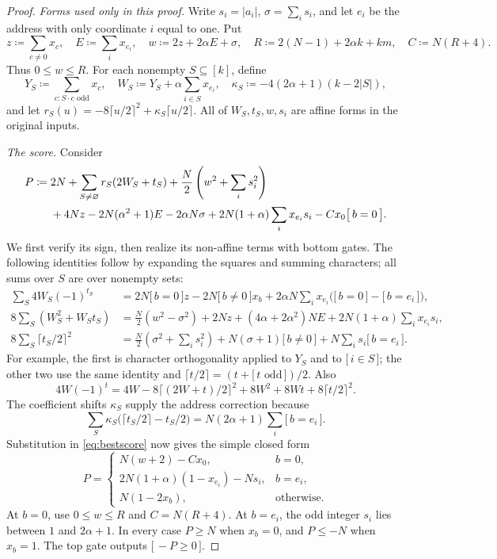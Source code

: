 \documentclass[11pt,letterpaper]{article}
\theoremstyle{remark}
\newcommand{\ind}[1]{\bigl[\,#1\,\bigr]}
\begin{document}
\begin{proof}
\emph{Forms used only in this proof.}
Write $s_i=|a_i|$, $\sigma=\sum_i s_i$, and let $e_i$ be the address with
only coordinate $i$ equal to one. Put
\[
z\coloneqq\sum_{c\ne0}x_c,\quad E\coloneqq\sum_i x_{e_i},\quad
w\coloneqq2z+2\alpha E+\sigma,\quad R\coloneqq2(N-1)+2\alpha k+km,\quad C\coloneqq N(R+4).
\]
Thus $0\le w\le R$. For each nonempty $S\subseteq[k]$, define
\[
Y_S\coloneqq\sum_{c:S\cdot c\text{ odd}}x_c,\quad
W_S\coloneqq Y_S+\alpha\sum_{i\in S}x_{e_i},\quad
\kappa_S\coloneqq-4(2\alpha+1)(k-2|S|),
\]
and let $r_S(u)=-8\lceil u/2\rceil^2+\kappa_S\lceil u/2\rceil$.
All of $W_S,t_S,w,s_i$ are affine forms in the original inputs.

\emph{The score.} Consider
\begin{align}\label{eq:bestscore}
P\coloneqq{}&2N+\sum_{S\ne\varnothing}r_S(2W_S+t_S)
 +\frac N2\left(w^2+\sum_i s_i^2\right)\notag\\
 &+4Nz-2N(\alpha^2+1)E-2\alpha N\sigma
 +2N(1+\alpha)\sum_i x_{e_i}s_i-Cx_0\ind{b=0}.
\end{align}
We first verify its sign, then realize its non-affine terms with bottom gates.
The following identities follow by expanding the squares and summing
characters; all sums over $S$ are over nonempty sets:
\begin{align*}
\sum_S4W_S(-1)^{t_S}
 &=2N\ind{b=0}z-2N\ind{b\ne0}x_b
   +2\alpha N\sum_i x_{e_i}\bigl(\ind{b=0}-\ind{b=e_i}\bigr),\\
8\sum_S(W_S^2+W_St_S)
 &=\frac N2(w^2-\sigma^2)+2Nz+(4\alpha+2\alpha^2)NE
   +2N(1+\alpha)\sum_i x_{e_i}s_i,\\
8\sum_S\lceil t_S/2\rceil^2
 &=\frac N2\left(\sigma^2+\sum_i s_i^2\right)
   +N(\sigma+1)\ind{b\ne0}+N\sum_i s_i\ind{b=e_i}.
\end{align*}
For example, the first is character orthogonality applied to $Y_S$ and to
$\ind{i\in S}$; the other two use the same identity and
$\lceil t/2\rceil=(t+\ind{t\text{ odd}})/2$.
Also
\[
4W(-1)^t=4W-8\lceil(2W+t)/2\rceil^2+8W^2+8Wt+8\lceil t/2\rceil^2.
\]
The coefficient shifts $\kappa_S$ supply the address correction because
\[
\sum_S\kappa_S\bigl(\lceil t_S/2\rceil-t_S/2\bigr)
 =N(2\alpha+1)\sum_i\ind{b=e_i}.
\]
Substitution in \eqref{eq:bestscore} now gives the simple closed form
\begin{equation}\label{eq:bestclosed}
P=\begin{cases}
N(w+2)-Cx_0,&b=0,\\
2N(1+\alpha)(1-x_{e_i})-Ns_i,&b=e_i,\\
N(1-2x_b),&\text{otherwise}.
\end{cases}
\end{equation}
At $b=0$, use $0\le w\le R$ and $C=N(R+4)$. At $b=e_i$, the odd
integer $s_i$ lies between $1$ and $2\alpha+1$. In every case $P\ge N$
when $x_b=0$, and $P\le-N$ when $x_b=1$. The top gate outputs $\ind{-P\ge0}$.


\end{proof}
\end{document}
